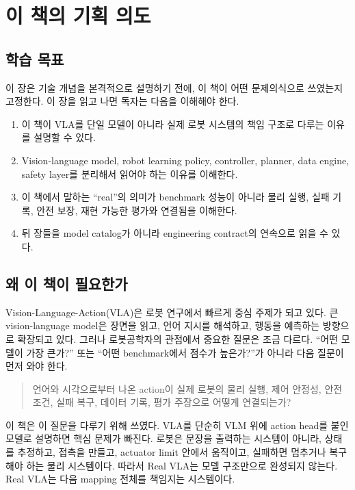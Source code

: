 \chapter{이 책의 기획 의도}

\section*{학습 목표}
이 장은 기술 개념을 본격적으로 설명하기 전에, 이 책이 어떤 문제의식으로 쓰였는지 고정한다. 이 장을 읽고 나면 독자는 다음을 이해해야 한다.

\begin{enumerate}
  \item 이 책이 VLA를 단일 모델이 아니라 실제 로봇 시스템의 책임 구조로 다루는 이유를 설명할 수 있다.
  \item Vision-language model, robot learning policy, controller, planner, data engine, safety layer를 분리해서 읽어야 하는 이유를 이해한다.
  \item 이 책에서 말하는 ``real''의 의미가 benchmark 성능이 아니라 물리 실행, 실패 기록, 안전 보장, 재현 가능한 평가와 연결됨을 이해한다.
  \item 뒤 장들을 model catalog가 아니라 engineering contract의 연속으로 읽을 수 있다.
\end{enumerate}

\section{왜 이 책이 필요한가}

Vision-Language-Action(VLA)은 로봇 연구에서 빠르게 중심 주제가 되고 있다. 큰 vision-language model은 장면을 읽고, 언어 지시를 해석하고, 행동을 예측하는 방향으로 확장되고 있다. 그러나 로봇공학자의 관점에서 중요한 질문은 조금 다르다. ``어떤 모델이 가장 큰가?'' 또는 ``어떤 benchmark에서 점수가 높은가?''가 아니라 다음 질문이 먼저 와야 한다.

\begin{quote}
언어와 시각으로부터 나온 action이 실제 로봇의 물리 실행, 제어 안정성, 안전 조건, 실패 복구, 데이터 기록, 평가 주장으로 어떻게 연결되는가?
\end{quote}

이 책은 이 질문을 다루기 위해 쓰였다. VLA를 단순히 VLM 위에 action head를 붙인 모델로 설명하면 핵심 문제가 빠진다. 로봇은 문장을 출력하는 시스템이 아니라, 상태를 추정하고, 접촉을 만들고, actuator limit 안에서 움직이고, 실패하면 멈추거나 복구해야 하는 물리 시스템이다. 따라서 Real VLA는 모델 구조만으로 완성되지 않는다. Real VLA는 다음 mapping 전체를 책임지는 시스템이다.

